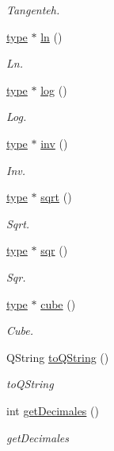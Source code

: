 \begin{DoxyCompactItemize}
\begin{DoxyCompactList}\small\item\em Tangenteh. \end{DoxyCompactList}\item 
\hyperlink{classtype}{type} $\ast$ \hyperlink{classreel_a5d09de0b7e0856eb63d333f766c770ed}{ln} ()
\begin{DoxyCompactList}\small\item\em Ln. \end{DoxyCompactList}\item 
\hyperlink{classtype}{type} $\ast$ \hyperlink{classreel_adcf600e2052329def8e10e81e35ef96e}{log} ()
\begin{DoxyCompactList}\small\item\em Log. \end{DoxyCompactList}\item 
\hyperlink{classtype}{type} $\ast$ \hyperlink{classreel_ab863c6b28a5345dbf7657b4b5121c2f7}{inv} ()
\begin{DoxyCompactList}\small\item\em Inv. \end{DoxyCompactList}\item 
\hyperlink{classtype}{type} $\ast$ \hyperlink{classreel_a980bc278bf5537519ee05746262ebb6a}{sqrt} ()
\begin{DoxyCompactList}\small\item\em Sqrt. \end{DoxyCompactList}\item 
\hyperlink{classtype}{type} $\ast$ \hyperlink{classreel_ad295586d5862f6dc41966f25c365c4a1}{sqr} ()
\begin{DoxyCompactList}\small\item\em Sqr. \end{DoxyCompactList}\item 
\hyperlink{classtype}{type} $\ast$ \hyperlink{classreel_a3a2dc28d66ee81177a986fca957f6fd5}{cube} ()
\begin{DoxyCompactList}\small\item\em Cube. \end{DoxyCompactList}\item 
Q\-String \hyperlink{classreel_a6b06a283958b63fde5c12382b744a8c9}{to\-Q\-String} ()
\begin{DoxyCompactList}\small\item\em to\-Q\-String \end{DoxyCompactList}\item 
int \hyperlink{classreel_a4615a947e25064384fd0216881b89c7b}{get\-Decimales} ()
\begin{DoxyCompactList}\small\item\em get\-Decimales \end{DoxyCompactList}\end{DoxyCompactItemize}


